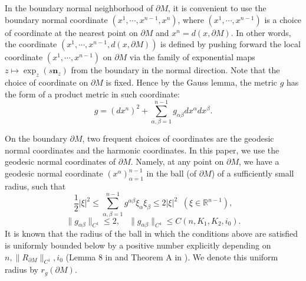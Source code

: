 \documentclass[11pt,letterpaper]{amsart}
\numberwithin{equation}{section}
\theoremstyle{definition}
\theoremstyle{plain}
\theoremstyle{definition}
\theoremstyle{plain}
\theoremstyle{definition}
\theoremstyle{plain}
\begin{document}
In the boundary normal neighborhood of $\partial M$, it is convenient to use the boundary normal coordinate $(x^1,\cdots,x^{n-1},x^n)$, where $(x^1,\cdots,x^{n-1})$ is a choice of coordinate at the nearest point on $\partial M$ and $x^n=d(x,\partial M)$. In other words, the coordinate $(x^1,\cdots,x^{n-1},d(x,\partial M))$ is defined by pushing forward the local coordinate $(x^1,\cdots,x^{n-1})$ on $\partial M$ via the family of exponential maps $z\mapsto\exp_z(s\textbf{n}_z)$ from the boundary in the normal direction. Note that the choice of coordinate on $\partial M$ is fixed. Hence by the Gauss lemma, the metric $g$ has the form of a product metric in such coordinate: 
$$g=(d x^n)^2+\sum_{\alpha,\beta=1}^{n-1}g_{\alpha\beta}dx^{\alpha}dx^{\beta}.$$

On the boundary $\partial M$, two frequent choices of coordinates are the geodesic normal coordinates and the harmonic coordinates. In this paper, we use the geodesic normal coordinates of $\partial M$. Namely, at any point on $\partial M$, we have a geodesic normal coordinate $(x^{\alpha})_{\alpha=1}^{n-1}$ in the ball (of $\partial M$) of a sufficiently small radius, such that 
\begin{equation}\label{coorb}
\frac{1}{2}|\xi|^2\leqslant \sum_{\alpha,\beta=1}^{n-1} g^{\alpha\beta}\xi_{\alpha}\xi_{\beta} \leqslant 2|\xi|^2\;\; (\xi\in\mathbb{R}^{n-1}),
\end{equation}
$$\|g_{\alpha\beta}\|_{C^{1}}\leqslant 2,\quad  \|g_{\alpha\beta}\|_{C^{4}}\leqslant C(n,K_1,K_2,i_0).$$
It is known that the radius of the ball in which the conditions above are satisfied is uniformly bounded below by a positive number explicitly depending on $n, \|R_{\partial M}\|_{C^1},i_0$ (Lemma 8 in \cite{HV} and Theorem A in \cite{E}). We denote this uniform radius by $r_g(\partial M)$. 
\end{document}
